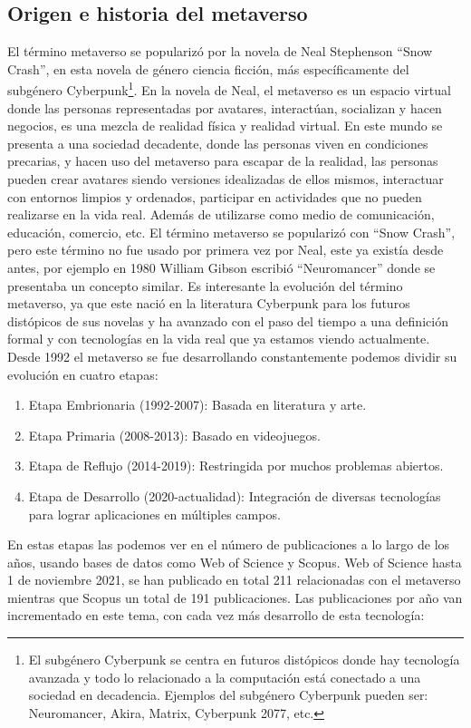 \documentclass[a4paper,10pt]{article}
\begin{document}
	\subsection{Origen e historia del metaverso}
	El término metaverso se popularizó por la novela de Neal Stephenson “Snow Crash”, en esta novela de género ciencia ficción, más específicamente del subgénero Cyberpunk\footnote{El subgénero Cyberpunk se centra en futuros distópicos donde hay tecnología avanzada y todo lo relacionado a la computación está conectado a una sociedad en decadencia. Ejemplos del subgénero Cyberpunk pueden ser: Neuromancer, Akira, Matrix, Cyberpunk 2077, etc.}. En la novela de Neal, el metaverso es un espacio virtual donde las personas representadas por avatares, interactúan, socializan y hacen negocios, es una mezcla de realidad física y realidad virtual. En este mundo se presenta a una sociedad decadente, donde las personas viven en condiciones precarias, y hacen uso del metaverso para escapar de la realidad, las personas pueden crear avatares siendo versiones idealizadas de ellos mismos, interactuar con entornos limpios y ordenados, participar en actividades que no pueden realizarse en la vida real. Además de utilizarse como medio de comunicación, educación, comercio, etc. El término metaverso se popularizó con “Snow Crash”, pero este término no fue usado por primera vez por Neal, este ya existía desde antes, por ejemplo en 1980 William Gibson escribió “Neuromancer” donde se presentaba un concepto similar. Es interesante la evolución del término metaverso, ya que este nació en la literatura Cyberpunk para los futuros distópicos de sus novelas y ha avanzado con el paso del tiempo a una definición formal y con tecnologías en la vida real que ya estamos viendo actualmente. Desde 1992 el metaverso se fue desarrollando constantemente podemos dividir su evolución en cuatro etapas:
	\begin{enumerate}
	\item Etapa Embrionaria (1992-2007): Basada en literatura y arte.
	\item Etapa Primaria (2008-2013): Basado en videojuegos.
	\item Etapa de Reflujo (2014-2019): Restringida por muchos problemas abiertos.
	\item Etapa de Desarrollo (2020-actualidad): Integración de diversas tecnologías para lograr aplicaciones en múltiples campos.
	\end{enumerate}
	En estas etapas las podemos ver en el número de publicaciones a lo largo de los años, usando bases de datos como Web of Science y Scopus. Web of Science hasta 1 de noviembre 2021, se han publicado  en total 211 relacionadas con el metaverso mientras que Scopus un total de 191 publicaciones. Las publicaciones por año van incrementado en este tema, con cada vez más desarrollo de esta tecnología:
\end{document}
